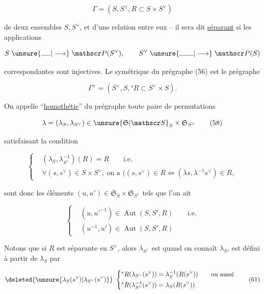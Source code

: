 \[
\Gamma=(S,S^\vee,R\subset S\times S^\vee) \tag*{(56)}
\]

de deux ensembles $S,S^\vee$, et d'une relation entre eux -- il sera dit \uline{séparant} si les applications

\[
S\mathrel{\unsure{\rule{1.35em}{0.35pt}|\longrightarrow}}\mathscr P(S^\vee),\qquad S^\vee\mathrel{\unsure{\rule{2em}{0.35pt}|\longrightarrow}}\mathscr P(S)
\]

correspondantes sont injectives. Le symétrique du prégraphe (56) est le prégraphe

\[
\Gamma^\vee=(S^\vee,S,{}^sR\subset S^\vee\times S). \tag*{(57)}
\]

On appelle ``\uline{homothétie}'' du prégraphe toute paire de permutations

\[
\lambda=(\lambda_S,\lambda_{S^\vee})\in\unsure{\mathfrak S|\mathscr S}_S\times\mathfrak S_{S^\vee} \tag*{(58)}
\]

satisfaisant la condition

\[
\left\{\begin{aligned}
&(\lambda_S,\lambda_{S^\vee}^{-1})(R)=R\qquad\text{i.e.}\\
&\forall(s,s^\vee)\in S\times S^\vee,\ \text{on a }\bigl((s,s^\vee)\in R\iff(\lambda s,\lambda^{-1}s^\vee)\in R,
\end{aligned}\right. \tag*{(59)}
\]

 sont donc les éléments   $(u,u')\in\mathfrak S_S\times\mathfrak S_{S^\vee}$ tels que l'on ait

\[
\left\{\begin{aligned}
&(u,u'^{-1})\in\operatorname{Aut}(S,S',R)\qquad\text{i.e.}\\
&(u^{-1},u')\in\operatorname{Aut}(S,S',R)
\end{aligned}\right. \tag*{(60)}
\]

Notons que si $R$ est séparante en $S^\vee$, alors $\lambda_{S^\vee}$ est  quand on connaît $\lambda_S$,  est défini à partir de $\lambda_S$ par

\[
\deleted{\unsure{\lambda_S(s^\vee)|\lambda_{S^\vee}(s^\vee)}}\
\left\{\begin{aligned}
&{}^sR(\lambda_{S^\vee}(s^\vee))=\lambda_S^{-1}(R(s^\vee))\qquad\text{ou aussi}\\
&{}^sR(\lambda_{S^\vee}^{-1}(s^\vee))=\lambda_S(R(s^\vee))
\end{aligned}\right. \tag*{(61)}
\]

